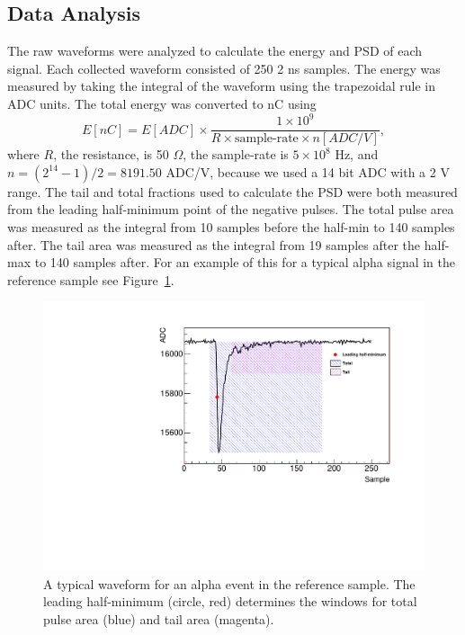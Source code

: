 \subsection{Data Analysis}

The raw waveforms were analyzed to calculate the energy and PSD of each signal. 
Each collected waveform consisted of 250 2 ns samples.
The energy was measured by taking the integral of the waveform using the trapezoidal rule in ADC units.
The total energy was converted to nC using
\begin{equation}
E[nC] = E[ADC] \times \frac{1\times10^9}{R\times\textrm{sample-rate}\times n[ADC/V]},
\end{equation}
where $R$, the resistance, is 50 $\Omega$, the sample-rate is $5\times10^8$ Hz, and $n = (2^{14} -1)/2 = 8191.50$ ADC/V, because we used a 14 bit ADC with a 2 V range.
The tail and total fractions used to calculate the PSD were both measured from the leading half-minimum point of the negative pulses.
The total pulse area was measured as the integral from 10 samples before the half-min to 140 samples after.
The tail area was measured as the integral from 19 samples after the half-max to 140 samples after.
For an example of this for a typical alpha signal in the reference sample see Figure~\ref{fig:waveformbnl}.

\begin{figure}[!t]
	\centering
	\includegraphics[width=0.6\linewidth]{tex/6-ac227-images/BNL/Waveform_BNL}
	\caption{A typical waveform for an alpha event in the reference sample. The leading half-minimum (circle, red) determines the windows for total pulse area (blue) and tail area (magenta).}
	\label{fig:waveformbnl}
\end{figure}


